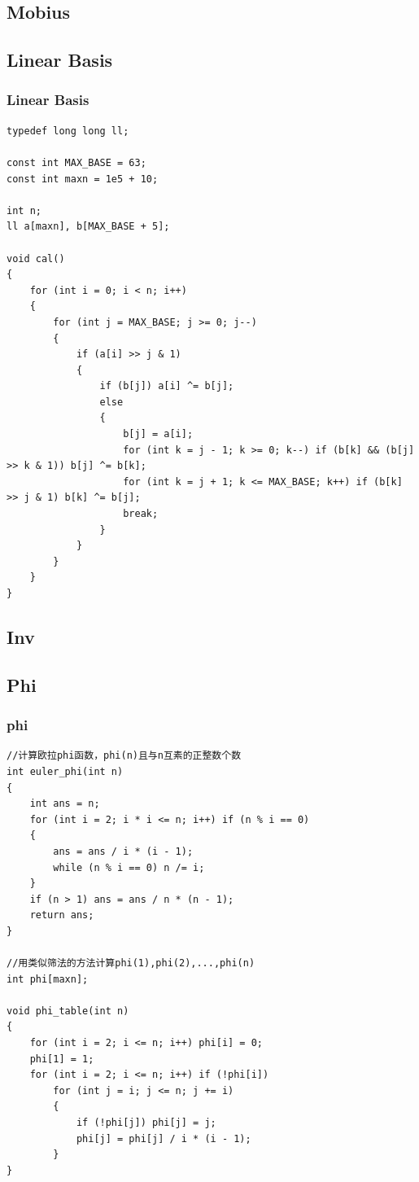 \documentclass[twoside]{article}
\begin{document}
\subsection{Mobius}
\subsection{Linear Basis}
\subsubsection{Linear Basis}
\begin{lstlisting}
typedef long long ll;

const int MAX_BASE = 63;
const int maxn = 1e5 + 10;

int n;
ll a[maxn], b[MAX_BASE + 5];

void cal()
{
    for (int i = 0; i < n; i++)
    {
        for (int j = MAX_BASE; j >= 0; j--)
        {
            if (a[i] >> j & 1)
            {
                if (b[j]) a[i] ^= b[j];
                else
                {
                    b[j] = a[i];
                    for (int k = j - 1; k >= 0; k--) if (b[k] && (b[j] >> k & 1)) b[j] ^= b[k];
                    for (int k = j + 1; k <= MAX_BASE; k++) if (b[k] >> j & 1) b[k] ^= b[j];
                    break;
                }
            }
        }
    }
}
\end{lstlisting}
\subsection{Inv}
\subsection{Phi}
\subsubsection{phi}
\begin{lstlisting}
//计算欧拉phi函数，phi(n)且与n互素的正整数个数
int euler_phi(int n)
{
    int ans = n;
    for (int i = 2; i * i <= n; i++) if (n % i == 0)
    {
        ans = ans / i * (i - 1);
        while (n % i == 0) n /= i;
    }
    if (n > 1) ans = ans / n * (n - 1);
    return ans;
}

//用类似筛法的方法计算phi(1),phi(2),...,phi(n)
int phi[maxn];

void phi_table(int n)
{
    for (int i = 2; i <= n; i++) phi[i] = 0;
    phi[1] = 1;
    for (int i = 2; i <= n; i++) if (!phi[i])
        for (int j = i; j <= n; j += i)
        {
            if (!phi[j]) phi[j] = j;
            phi[j] = phi[j] / i * (i - 1);
        }
}\end{lstlisting}
\end{document}
